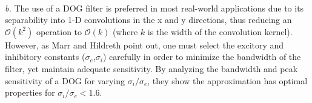 \documentclass{article}
\begin{document}
\begin{enumerate}
\\
\textit{b.} The use of a DOG filter is preferred in most real-world applications due to its separability into 1-D convolutions in the x and y directions, thus reducing an $\mathcal{O}(k^2)$ operation to $\mathcal{O}(k)$ (where $k$ is the width of the convolution kernel).  However, as Marr and Hildreth point out, one must select the excitory and inhibitory constants ($\sigma_e$,$\sigma_i$) carefully in order to minimize the bandwidth of the filter, yet maintain adequate sensitivity.  By analyzing the bandwidth and peak sensitivity of a DOG for 
varying $\sigma_i/\sigma_e$, they show the approximation has optimal properties for $\sigma_i/\sigma_e<1.6$\cite{marrhildreth80}.  
\end{enumerate}

\end{document}
